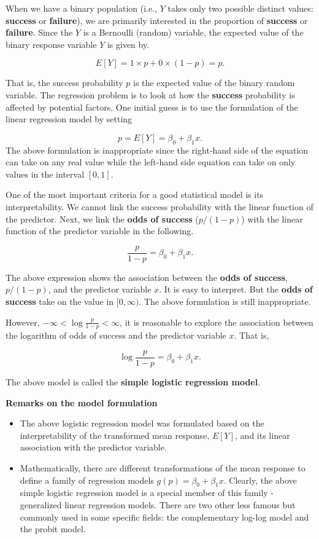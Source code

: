 \documentclass[
]{book}
\begin{document}
When we have a binary population (i.e., \(Y\) takes only two possible distinct values: \textbf{success} or \textbf{failure}), we are primarily interested in the proportion of \textbf{success} or \textbf{failure}. Since the \(Y\) is a Bernoulli (random) variable, the expected value of the binary response variable \(Y\) is given by.

\[
E[Y] = 1\times p + 0\times (1-p) = p.
\]

That is, the success probability \(p\) is the expected value of the binary random variable. The regression problem is to look at how the \textbf{success} probability is affected by potential factors. One initial guess is to use the formulation of the linear regression model by setting

\[
p =E[Y] = \beta_0 + \beta_1 x.
\]
The above formulation is inappropriate since the right-hand side of the equation can take on any real value while the left-hand side equation can take on only values in the interval \([0,1]\).

One of the most important criteria for a good statistical model is its interpretability. We cannot link the success probability with the linear function of the predictor. Next, we link the \textbf{odds of success} (\(p/(1-p)\)) with the linear function of the predictor variable in the following.

\[
\frac{p}{1-p} = \beta_0 + \beta_1x.
\]

The above expression shows the association between the \textbf{odds of success}, \(p/(1-p)\), and the predictor variable \(x\). It is easy to interpret. But the \textbf{odds of success} take on the value in \([0, \infty)\). The above formulation is still inappropriate.

However, \(-\infty <\log\frac{p}{1-p} < \infty\), it is reasonable to explore the association between the logarithm of odds of success and the predictor variable \(x\). That is,

\[
\log\frac{p}{1-p} = \beta_0 + \beta_1x.
\]

The above model is called the \textbf{simple logistic regression model}.

\textbf{Remarks on the model formulation}

\begin{itemize}
\item
  The above logistic regression model was formulated based on the interpretability of the transformed mean response, \(E[Y]\), and its linear association with the predictor variable.
\item
  Mathematically, there are different transformations of the mean response to define a family of regression models \(g(p) = \beta_0 + \beta_1x\). Clearly, the above simple logistic regression model is a special member of this family - generalized linear regression models. There are two other less famous but commonly used in some specific fields: the complementary log-log model and the probit model.
\end{itemize}
\end{document}
